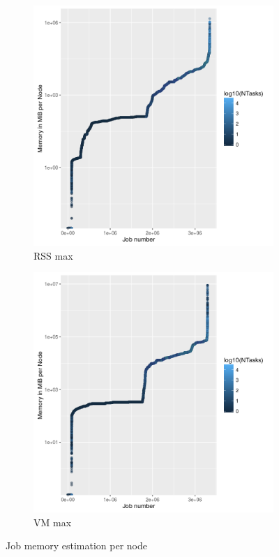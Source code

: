 \documentclass{../../template/esiwace-report}
\begin{document}
\begin{figure}
\begin{subfigure}[t]{0.49\textwidth}
\includegraphics[width=\textwidth]{mem-stats/perNodeEstimateRSS}
\caption{RSS max}
\label{fig:rssMax}
\end{subfigure}
\begin{subfigure}[t]{0.49\textwidth}
\includegraphics[width=\textwidth]{mem-stats/perNodeEstimateVM}
\caption{VM max}
\label{fig:vmMax}
\end{subfigure}

\caption{Job memory estimation per node}
\label{fig:job-memory}
\end{figure}
\end{document}
